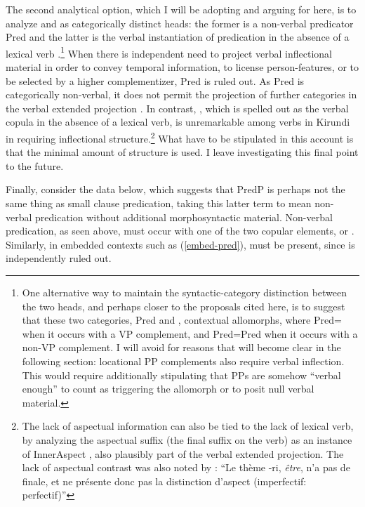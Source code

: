 \documentclass[12pt]{article}
\begin{document}
The second analytical option, which I will be adopting and arguing for here, is to analyze  and  as categorically distinct heads: the former is a non-verbal predicator Pred and the latter is the verbal instantiation  of predication in the absence of a lexical verb \citep{bowers-1993,bowers-2002,adger-ramchand-2003}.\footnote{One alternative way to maintain the syntactic-category distinction between the two heads, and perhaps closer to the proposals cited here, is to suggest that these two categories, Pred and , contextual allomorphs, where Pred= when it occurs with a VP complement, and Pred=Pred when it occurs with a non-VP complement. I will avoid for reasons that will become clear in the following section: locational PP complements also require verbal inflection. This would require additionally stipulating that PPs are somehow ``verbal enough'' to count as triggering the  allomorph or to posit null verbal material.} When there is independent need to project verbal inflectional material in order to convey temporal information, to license person-features, or to be selected by a higher complementizer, Pred is ruled out. As Pred is categorically non-verbal, it does not permit the projection of further categories in the verbal extended projection \citep{grimshaw-2000}. In contrast, , which is spelled out as the verbal copula  in the absence of a lexical verb, is unremarkable among verbs in Kirundi in requiring inflectional structure.\footnote{The lack of aspectual information can also be tied to the lack of lexical verb, by analyzing the aspectual suffix (the final suffix on the verb) as an instance of InnerAspect \citep{travis-2010}, also plausibly part of the verbal extended projection. The lack of aspectual contrast was also noted by \citet[p. 184]{meeussen-1959}: ``Le thème -ri, \textit{être}, n'a pas de finale, et ne présente donc pas la distinction d'aspect (imperfectif: perfectif)''} What  have to be stipulated in this account is that the minimal amount of structure is used. I leave investigating this final point to the future. 

Finally, consider the data below, which suggests that PredP is perhaps not the same thing as small clause predication, taking this latter term to mean non-verbal predication without additional morphosyntactic material. Non-verbal predication, as seen above, must occur with one of the two copular elements,  or . Similarly, in embedded contexts such as (\ref{embed-pred}),  must be present, since  is independently ruled out.
\end{document}
